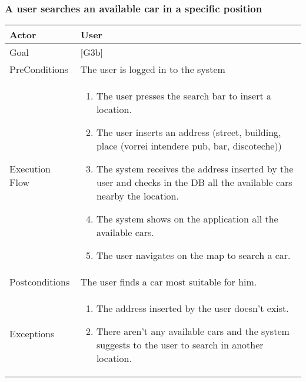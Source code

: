 \documentclass{article}
\begin{document}
	\subsubsection{A user searches an available car in a specific position}
	\begin{tabularx}{\textwidth}{  l  X  }
		\hline
		Actor & User\\
		\hline
		Goal & [G3b]\\
		\hline
		PreConditions & The user is logged in to the system\\
		\hline
		Execution Flow & \begin{enumerate}
			\item{The user presses the search bar to insert a location.}
										 \item{The user inserts an address (street, building, place (vorrei intendere pub, bar, discoteche))}
										 \item{The system receives the address inserted by the user and checks in the DB all the available cars nearby the location.}
										 \item{The system shows on the application all the available cars.}
										 \item{The user navigates on the map to search a car.}
										\end{enumerate}\\
		\hline
		Postconditions & The user finds a car most suitable for him.\\
		\hline
		Exceptions & \begin{enumerate}
				\item{The address inserted by the user doesn't exist.}
								 \item{There aren't any available cars and the system suggests to the user to search in another location.}
					\end{enumerate}\\
		\hline
	\end{tabularx}
\end{document}
